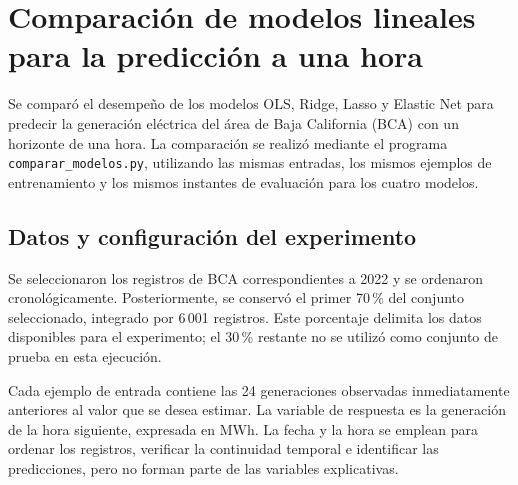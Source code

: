 






\section{Comparación de modelos lineales para la predicción a una hora}
\label{sec:comparacion-lineales-una-hora}

Se comparó el desempeño de los modelos OLS, Ridge, Lasso y Elastic Net para predecir la generación eléctrica del área de Baja California (BCA) con un horizonte de una hora. La comparación se realizó mediante el programa \texttt{comparar\_modelos.py}, utilizando las mismas entradas, los mismos ejemplos de entrenamiento y los mismos instantes de evaluación para los cuatro modelos.

\subsection{Datos y configuración del experimento}

Se seleccionaron los registros de BCA correspondientes a 2022 y se ordenaron cronológicamente. Posteriormente, se conservó el primer 70\,\% del conjunto seleccionado, integrado por 6\,001 registros. Este porcentaje delimita los datos disponibles para el experimento; el 30\,\% restante no se utilizó como conjunto de prueba en esta ejecución.

Cada ejemplo de entrada contiene las 24 generaciones observadas inmediatamente anteriores al valor que se desea estimar. La variable de respuesta es la generación de la hora siguiente, expresada en MWh. La fecha y la hora se emplean para ordenar los registros, verificar la continuidad temporal e identificar las predicciones, pero no forman parte de las variables explicativas.

